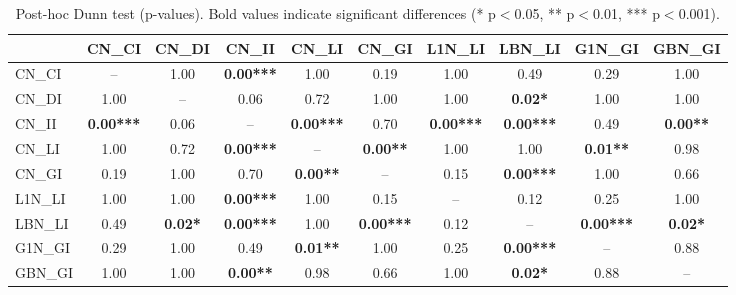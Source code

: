 \begin{table}[ht]
\centering
\begin{tabular}{lccccccccc}
\toprule
 & CN_CI & CN_DI & CN_II & CN_LI & CN_GI & L1N_LI & LBN_LI & G1N_GI & GBN_GI \\
\midrule
CN_CI & -- & 1.00 & \textbf{0.00***} & 1.00 & 0.19 & 1.00 & 0.49 & 0.29 & 1.00 \\
CN_DI & 1.00 & -- & 0.06 & 0.72 & 1.00 & 1.00 & \textbf{0.02*} & 1.00 & 1.00 \\
CN_II & \textbf{0.00***} & 0.06 & -- & \textbf{0.00***} & 0.70 & \textbf{0.00***} & \textbf{0.00***} & 0.49 & \textbf{0.00**} \\
CN_LI & 1.00 & 0.72 & \textbf{0.00***} & -- & \textbf{0.00**} & 1.00 & 1.00 & \textbf{0.01**} & 0.98 \\
CN_GI & 0.19 & 1.00 & 0.70 & \textbf{0.00**} & -- & 0.15 & \textbf{0.00***} & 1.00 & 0.66 \\
L1N_LI & 1.00 & 1.00 & \textbf{0.00***} & 1.00 & 0.15 & -- & 0.12 & 0.25 & 1.00 \\
LBN_LI & 0.49 & \textbf{0.02*} & \textbf{0.00***} & 1.00 & \textbf{0.00***} & 0.12 & -- & \textbf{0.00***} & \textbf{0.02*} \\
G1N_GI & 0.29 & 1.00 & 0.49 & \textbf{0.01**} & 1.00 & 0.25 & \textbf{0.00***} & -- & 0.88 \\
GBN_GI & 1.00 & 1.00 & \textbf{0.00**} & 0.98 & 0.66 & 1.00 & \textbf{0.02*} & 0.88 & -- \\
\bottomrule
\end{tabular}
\caption{Post-hoc Dunn test (p-values). Bold values indicate significant differences (* p$<$0.05, ** p$<$0.01, *** p$<$0.001).}
\label{tab:dunn_posthoc}
\end{table}